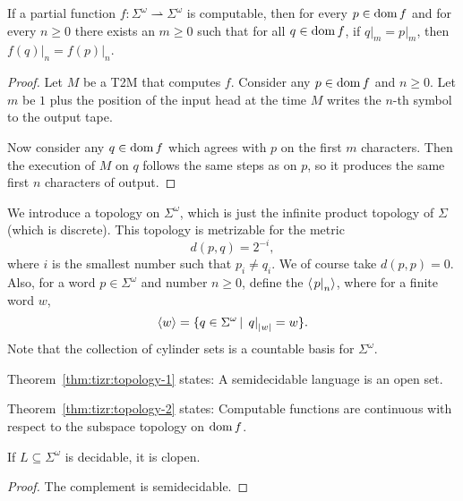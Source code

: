 \begin{theorem}%
  \label{thm:tizr:topology-2}
  If a partial function $f: \Sigma^\omega \rightharpoonup \Sigma^\omega$ is
  computable, then for every $p \in \operatorname{dom} f$ and for every $n \ge
  0$ there exists an $m \ge 0$ such that for all $q \in \operatorname{dom} f$,
  if $\left. q \right|_m = \left. p \right|_m$, then $\left. f(q) \right|_n =
  \left. f(p) \right|_n$.
\end{theorem}

\begin{proof}
  Let $M$ be a T2M that computes $f$.
  Consider any $p \in \operatorname{dom} f$ and $n \ge 0$.
  Let $m$ be $1$ plus the position of the input head at the time $M$ writes the
  $n$-th symbol to the output tape.

  Now consider any $q \in \operatorname{dom} f$ which agrees with $p$ on the first $m$
  characters.
  Then the execution of $M$ on $q$ follows the same steps as on $p$, so it
  produces the same first $n$ characters of output.
\end{proof}

We introduce a topology on $\Sigma^\omega$, which is just the infinite product
topology of $\Sigma$ (which is discrete).
This topology is metrizable for the metric
\[
  d(p,q) = 2^{-i},
\]
where $i$ is the smallest number such that $p_i \ne q_i$.
We of course take $d(p,p) = 0$.
Also, for a word $p \in \Sigma^\omega$ and number $n \ge 0$, define the
 $\left< \left. p \right|_n \right>$, where for a finite word $w$,
\[
  \left< w \right> = \{ q \in \Sigma^\omega \,|\, \left. q \right|_{\left| w \right|} = w \}.
\]
Note that the collection of cylinder sets is a countable basis for
$\Sigma^\omega$.

\begin{remark}
  Theorem~\ref{thm:tizr:topology-1} states:
  A semidecidable language is an open set.
\end{remark}

\begin{remark}
  Theorem~\ref{thm:tizr:topology-2} states:
  Computable functions are continuous with respect to the subspace topology on
  $\operatorname{dom} f$.
\end{remark}

\begin{proposition}
  If $L \subseteq \Sigma^\omega$ is decidable, it is clopen.
\end{proposition}

\begin{proof}
  The complement is semidecidable.
\end{proof}

